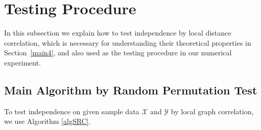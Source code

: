 \documentclass[11pt]{article}
\begin{document}
\section{Testing Procedure}
\label{main3}


In this subsection we explain how to test independence by local distance correlation, which is necessary for understanding their theoretical properties in Section~\ref{main4}, and also used as the testing procedure in our numerical experiment.

\subsection{Main Algorithm by Random Permutation Test}

To test independence on given sample data $\mathcal{X}$ and $\mathcal{Y}$ by local graph correlation, we use Algorithm \ref{algSRC}.
\end{document}
